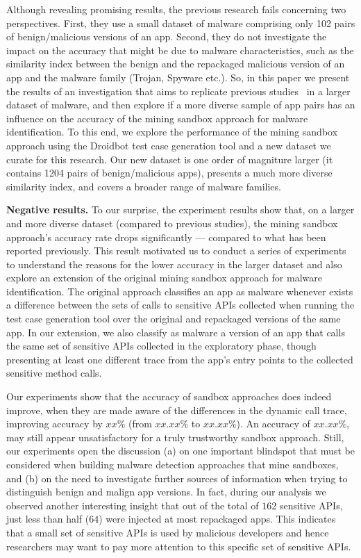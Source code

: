 Although revealing promising results, the previous research fails concerning two perspectives. First, they use a small dataset of malware comprising only 102 pairs of benign/malicious versions of an app. Second, they do not investigate the impact on the accuracy that might be due to malware characteristics, such as the similarity index between the benign and the repackaged malicious version of an app and the malware family {\color{red}(Trojan, Spyware etc.)}. So, in this paper we present the results of an investigation that aims to replicate previous studies~\cite{} in a larger dataset of malware, and then explore if a more diverse sample of app pairs has an influence on the accuracy of the mining sandbox approach for malware identification. To this end, we explore the performance of the mining sandbox approach using the Droidbot test case generation tool and a new dataset we curate for this research. Our new dataset is one order of magniture larger (it contains 1204 pairs of benign/malicious apps), presents a much more diverse similarity index, and covers a broader range of malware families. 



{\bf Negative results.} To our surprise, the experiment results show that, on a larger and more diverse dataset (compared to previous studies), the mining sandbox approach's accuracy rate drops significantly --- compared to what has been reported previously. This result motivated us to conduct a series of experiments to understand the reasons for the lower accuracy in the larger dataset and also explore an extension of the original mining sandbox approach for malware identification. The original approach classifies an app as malware whenever exists a difference between the sets of calls to sensitive APIs collected when running the test case generation tool over the original and repackaged versions of the same app. In our extension, we also classify as malware a version of an app that calls the same set of sensitive APIs collected in the exploratory phase, though presenting at least one different trace from the app's entry points to the collected sensitive method calls.


Our experiments show that the accuracy of sandbox approaches does indeed improve, when they are made aware of the differences in the dynamic call trace, improving accuracy by $xx\%$ (from $xx.xx\%$ to $xx.xx\%$). 
An accuracy of $xx.xx\%$, may still appear unsatisfactory for a truly trustworthy sandbox approach. Still, 
our experiments open the discussion (a) on one important blindspot that must be considered when building 
malware detection approaches that mine sandboxes, and (b) on the need to investigate further sources of information when trying to distinguish benign and malign app versions. 
In fact, during our analysis we observed another interesting insight that out of the total of $162$ sensitive APIs, just less than half ($64$) were injected at most repackaged apps. 
This indicates that a small set of sensitive APIs is used by malicious developers and hence 
researchers may want to pay more attention to this specific set of sensitive APIs.\\

